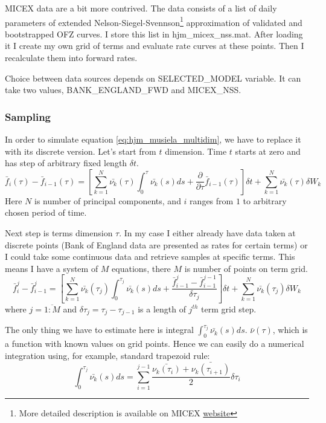 \documentclass[11pt]{article} %
\begin{document}
MICEX data are a bit more contrived. The data consists of a list of daily parameters of extended Nelson-Siegel-Svennson\footnote{More detailed description is available on MICEX \href{http://rts.micex.ru/a80}{website}} approximation of validated and bootstrapped OFZ curves. I store this list in hjm\_micex\_nss.mat. After loading it I create my own grid of terms and evaluate rate curves at these points. Then I recalculate them into forward rates.

Choice between data sources depends on SELECTED\_MODEL variable. It can take two values, BANK\_ENGLAND\_FWD and MICEX\_NSS.

\subsubsection{Sampling}
In order to simulate equation \eqref{eq:hjm_musiela_multidim}, we have to replace it with its discrete version. Let's start from $t$ dimension. Time $t$ starts at zero and has step of arbitrary fixed length $\delta t$.
\begin{equation}
\bar{f}_i(\tau) - \bar{f}_{i-1}(\tau) = \left[\sum_{k=1}^N\bar{\nu_k}(\tau)\int_{0}^{\tau}\bar{\nu_k}(s)ds+ \frac{\partial}{\partial \tau}\bar{f}_{i-1}(\tau)\right]\delta t + \sum_{k=1}^N\bar{\nu_k}(\tau)\delta W_{k}
\end{equation}
Here $N$ is number of principal components, and $i$ ranges from $1$ to arbitrary chosen period of time.

Next step is terms dimension $\tau$. In my case I either already have data taken at discrete points (Bank of England data are presented as rates for certain terms) or I could take some continuous data and retrieve samples at specific terms. This means I have a system of $M$ equations, there $M$ is number of points on term grid.
\begin{equation} \label{eq:hjm_musiela_multidim_discrete}
\bar{f}_i^j - \bar{f}_{i-1}^j = \left[\sum_{k=1}^N\bar{\nu_k}(\tau_j)\int_{0}^{\tau_j}\bar{\nu_k}(s)ds+ \frac{\bar{f}_{i-1}^j-\bar{f}_{i-1}^{j-1}}{\delta\tau_j}\right]\delta t + \sum_{k=1}^N\bar{\nu_k}(\tau_j)\delta W_{k}
\end{equation}
where $j = \overline{1:M}$ and $\delta\tau_j = \tau_j - \tau_{j-1}$ is a length of $j^{th}$ term grid step. 

The only thing we have to estimate here is integral $\int_{0}^{\tau_j}\bar{\nu_k}(s)ds$. $\bar{\nu}(\tau)$, which is a function with known values on grid points. Hence we can easily do a numerical integration using, for example, standard trapezoid rule:
\begin{equation}
\int_{0}^{\tau_j}\bar{\nu_k}(s)ds = \sum_{i=1}^{j-1}\frac{\bar{\nu_k(\tau_i)}+\bar{\nu_k(\tau_{i+1})}}{2}\delta\tau_i
\end{equation}
\end{document}

